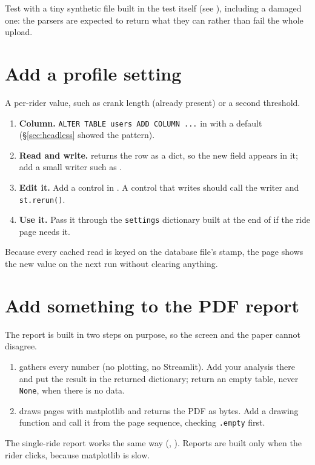 Test with a tiny synthetic file built in the test itself (see ), including a damaged one:
the parsers are expected to return what they can rather than fail the whole upload.

\section{Add a profile setting}\label{rec:setting}

A per-rider value, such as crank length (already present) or a second threshold.

\begin{enumerate}
\item \textbf{Column.} \texttt{ALTER TABLE users ADD COLUMN ...} in  with a default
  (\S\ref{sec:headless} showed the pattern).
\item \textbf{Read and write.}  returns the row as a dict, so the new field appears in it; add a
  small writer such as .
\item \textbf{Edit it.} Add a control in . A control that writes should call the writer and
  \texttt{st.rerun()}.
\item \textbf{Use it.} Pass it through the \texttt{settings} dictionary built at the end of  if
  the ride page needs it.
\end{enumerate}

Because every cached read is keyed on the database file's stamp, the page shows the new value on the next run
without clearing anything.

\section{Add something to the PDF report}\label{rec:report}

The report is built in two steps on purpose, so the screen and the paper cannot disagree.

\begin{enumerate}
\item {} gathers every number (no plotting, no
  Streamlit). Add your analysis there and put the result in the returned dictionary; return an empty table, never
  \texttt{None}, when there is no data.
\item {} draws pages with matplotlib and returns the PDF as bytes. Add a drawing
  function and call it from the page sequence, checking \texttt{.empty} first.
\end{enumerate}

The single-ride report works the same way (, ).
Reports are built only when the rider clicks, because matplotlib is slow.

